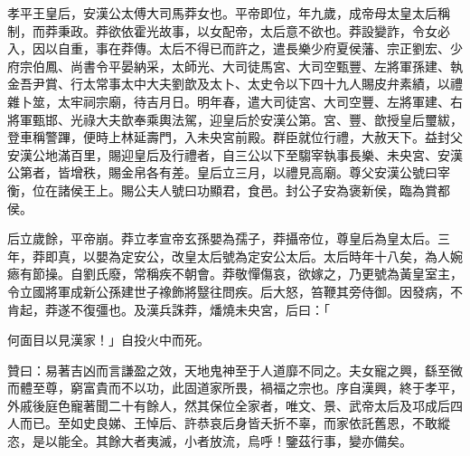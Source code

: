 \begin{pinyinscope}
孝平王皇后，安漢公太傅大司馬莽女也。平帝即位，年九歲，成帝母太皇太后稱制，而莽秉政。莽欲依霍光故事，以女配帝，太后意不欲也。莽設變詐，令女必入，因以自重，事在莽傳。太后不得已而許之，遣長樂少府夏侯藩、宗正劉宏、少府宗伯鳳、尚書令平晏納采，太師光、大司徒馬宮、大司空甄豐、左將軍孫建、執金吾尹賞、行太常事太中大夫劉歆及太卜、太史令以下四十九人賜皮弁素績，以禮雜卜筮，太牢祠宗廟，待吉月日。明年春，遣大司徒宮、大司空豐、左將軍建、右將軍甄邯、光祿大夫歆奉乘輿法駕，迎皇后於安漢公第。宮、豐、歆授皇后璽紱，登車稱警蹕，便時上林延壽門，入未央宮前殿。群臣就位行禮，大赦天下。益封父安漢公地滿百里，賜迎皇后及行禮者，自三公以下至騶宰執事長樂、未央宮、安漢公第者，皆增秩，賜金帛各有差。皇后立三月，以禮見高廟。尊父安漢公號曰宰衡，位在諸侯王上。賜公夫人號曰功顯君，食邑。封公子安為褒新侯，臨為賞都侯。

后立歲餘，平帝崩。莽立孝宣帝玄孫嬰為孺子，莽攝帝位，尊皇后為皇太后。三年，莽即真，以嬰為定安公，改皇太后號為定安公太后。太后時年十八矣，為人婉瘱有節操。自劉氏廢，常稱疾不朝會。莽敬憚傷哀，欲嫁之，乃更號為黃皇室主，令立國將軍成新公孫建世子襐飾將毉往問疾。后大怒，笞鞭其旁侍御。因發病，不肯起，莽遂不復彊也。及漢兵誅莽，燔燒未央宮，后曰：「

何面目以見漢家！」自投火中而死。

贊曰：易著吉凶而言謙盈之效，天地鬼神至于人道靡不同之。夫女寵之興，繇至微而體至尊，窮富貴而不以功，此固道家所畏，禍福之宗也。序自漢興，終于孝平，外戚後庭色寵著聞二十有餘人，然其保位全家者，唯文、景、武帝太后及邛成后四人而已。至如史良娣、王悼后、許恭哀后身皆夭折不辜，而家依託舊恩，不敢縱恣，是以能全。其餘大者夷滅，小者放流，烏呼！鑒茲行事，變亦備矣。


\end{pinyinscope}